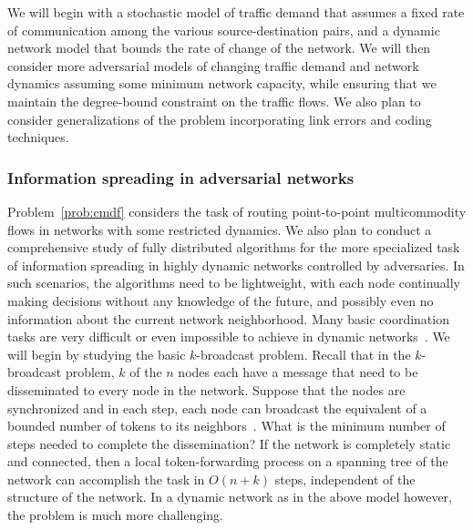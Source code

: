 
We will begin with a stochastic model of traffic demand that assumes a
fixed rate of communication among the various source-destination
pairs, and a dynamic network model that bounds the rate of change of
the network.  We will then consider more adversarial models of
changing traffic demand and network dynamics assuming some minimum
network capacity, while ensuring that we maintain the degree-bound
constraint on the traffic flows.  We also plan to consider
generalizations of the problem incorporating link errors and coding
techniques.



\subsubsection{Information spreading in adversarial networks}
Problem~\ref{prob:cmdf} considers the task of routing point-to-point
multicommodity flows in networks with some restricted dynamics.  We
also plan to conduct a comprehensive study of fully distributed
algorithms for the more specialized task of information spreading in
highly dynamic networks controlled by adversaries.  In such scenarios,
the algorithms need to be lightweight, with each node continually
making decisions without any knowledge of the future, and possibly
even no information about the current network neighborhood.  Many
basic coordination tasks are very difficult or even impossible to
achieve in dynamic networks~\cite{fich+r:impossibility}.  We will
begin by studying the basic $k$-broadcast problem.  Recall that in the
$k$-broadcast problem, $k$ of the $n$ nodes each have a message that
need to be disseminated to every node in the network.  Suppose that
the nodes are synchronized and in each step, each node can broadcast
the equivalent of a bounded number of tokens to its
neighbors~\cite{kuhn+lo:dynamic}.  What is the minimum number of steps
needed to complete the dissemination?  If the network is completely
static and connected, then a local token-forwarding process on a
spanning tree of the network can accomplish the task in $O(n + k)$
steps, independent of the structure of the network.  In a dynamic
network as in the above model however, the problem is much more
challenging.

